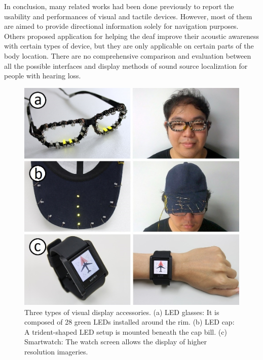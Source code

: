\documentclass{sigchi}
\begin{document}
In conclusion, many related works had been done previously to report the usability and performances of visual and tactile devices. However, most of them are aimed to provide directional information solely for navigation purposes. Others proposed application for helping the deaf improve their acoustic awareness with certain types of device, but they are only applicable on certain parts of the body location. There are no comprehensive comparison and evaluation between all the possible interfaces and display methods of sound source localization for people with hearing loss.

\begin{figure}[!t]
\centering
\includegraphics[width=0.8\columnwidth]{prototype_visual3}
\caption{Three types of visual display accessories. (a) LED glasses: It is composed of 28 green LEDs installed around the rim. (b) LED cap: A trident-shaped LED setup is mounted beneath the cap bill. (c) Smartwatch: The watch screen allows the display of higher resolution imageries.}
\label{fig:visual_devices}
\end{figure}
\end{document}
